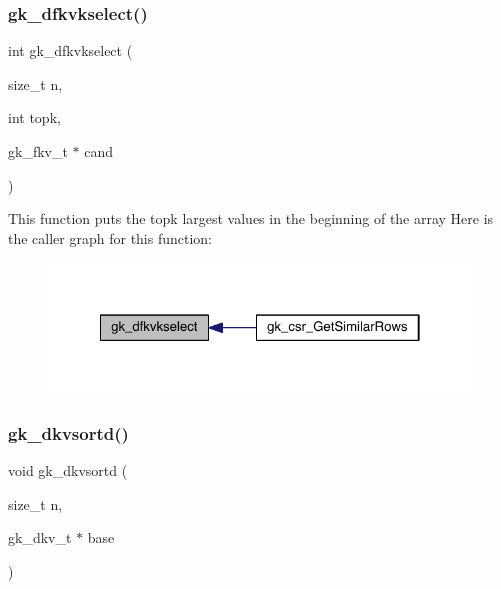 \mbox{\label{a00077_aeb6777a40bd13fe753dedd2871fc8899}} 
\subsubsection{\texorpdfstring{gk\+\_\+dfkvkselect()}{gk\_dfkvkselect()}}
{\footnotesize\ttfamily int gk\+\_\+dfkvkselect (\begin{DoxyParamCaption}\item[{size\+\_\+t}]{n,  }\item[{int}]{topk,  }\item[{gk\+\_\+fkv\+\_\+t $\ast$}]{cand }\end{DoxyParamCaption})}

This function puts the \textquotesingle{}topk\textquotesingle{} largest values in the beginning of the array Here is the caller graph for this function\+:\nopagebreak
\begin{figure}[H]
\begin{center}
\leavevmode
\includegraphics[width=322pt]{a00077_aeb6777a40bd13fe753dedd2871fc8899_icgraph}
\end{center}
\end{figure}
\mbox{\label{a00077_ac5138047355892676b7cb38afcfa8361}} 
\subsubsection{\texorpdfstring{gk\+\_\+dkvsortd()}{gk\_dkvsortd()}}
{\footnotesize\ttfamily void gk\+\_\+dkvsortd (\begin{DoxyParamCaption}\item[{size\+\_\+t}]{n,  }\item[{gk\+\_\+dkv\+\_\+t $\ast$}]{base }\end{DoxyParamCaption})}

